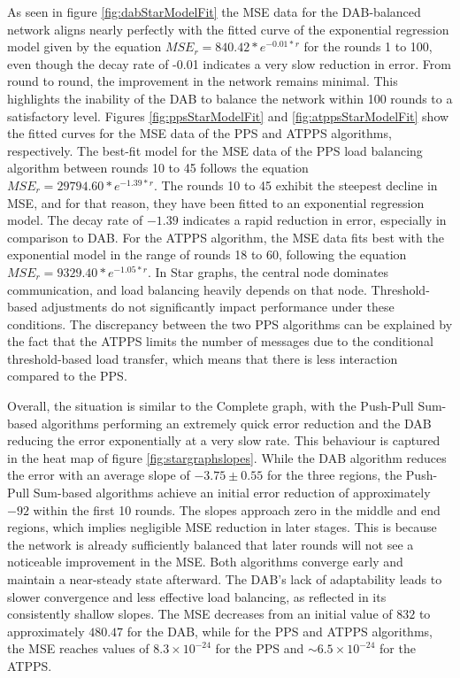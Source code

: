 As seen in figure \ref{fig:dabStarModelFit} the MSE data for the DAB-balanced network aligns nearly perfectly with the fitted curve of the exponential regression model given by the equation $MSE_r=840.42*e^{-0.01*r}$ for the rounds 1 to 100, even though the decay rate of -0.01 indicates a very slow reduction in error. From round to round, the improvement in the network remains minimal. This highlights the inability of the DAB to balance the network within 100 rounds to a satisfactory level. Figures \ref{fig:ppsStarModelFit} and \ref{fig:atppsStarModelFit} show the fitted curves for the MSE data of the PPS and ATPPS algorithms, respectively. The best-fit model for the MSE data of the PPS load balancing algorithm between rounds 10 to 45 follows the equation $MSE_r=29794.60*e^{-1.39*r}$. The rounds 10 to 45 exhibit the steepest decline in MSE, and for that reason, they have been fitted to an exponential regression model. The decay rate of $-1.39$ indicates a rapid reduction in error, especially in comparison to DAB. For the ATPPS algorithm, the MSE data fits best with the exponential model in the range of rounds 18 to 60, following the equation $MSE_r=9329.40*e^{-1.05*r}$. In Star graphs, the central node dominates communication, and load balancing heavily depends on that node. Threshold-based adjustments do not significantly impact performance under these conditions. The discrepancy between the two PPS algorithms can be explained by the fact that the ATPPS limits the number of messages due to the conditional threshold-based load transfer, which means that there is less interaction compared to the PPS.

Overall, the situation is similar to the Complete graph, with the Push-Pull Sum-based algorithms performing an extremely quick error reduction and the DAB reducing the error exponentially at a very slow rate. This behaviour is captured in the heat map of figure \ref{fig:stargraphslopes}. While the DAB algorithm reduces the error with an average slope of $-3.75 \pm 0.55$ for the three regions, the Push-Pull Sum-based algorithms achieve an initial error reduction of approximately $-92$ within the first 10 rounds. The slopes approach zero in the middle and end regions, which implies negligible MSE reduction in later stages. This is because the network is already sufficiently balanced that later rounds will not see a noticeable improvement in the MSE. Both algorithms converge early and maintain a near-steady state afterward. The DAB's lack of adaptability leads to slower convergence and less effective load balancing, as reflected in its consistently shallow slopes. The MSE decreases from an initial value of $832$ to approximately $480.47$ for the DAB, while for the PPS and ATPPS algorithms, the MSE reaches values of $8.3\times 10^{-24}$ for the PPS and $\sim6.5 \times 10^{-24}$ for the ATPPS.

